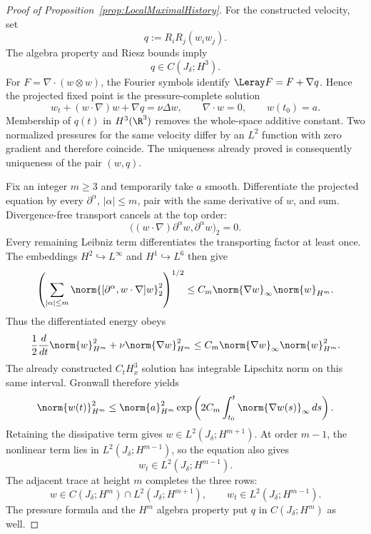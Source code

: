 \begin{proof}[Proof of Proposition~\ref{prop:LocalMaximalHistory}]

For the constructed velocity, set
\begin{equation}
  q:=R_iR_j(w_iw_j).
  \label{eq:LocalPressureFormula}
\end{equation}
The algebra property and Riesz bounds imply
\[
  q\in C(J_\delta;H^3).
\]
For \(F=\nabla\!\cdot(w\otimes w)\), the Fourier symbols identify
\(\Leray F=F+\nabla q\).  Hence the projected fixed point is the
pressure-complete solution
\[
  w_t+(w\cdot\nabla)w+\nabla q=\nu\Delta w,
  \qquad
  \nabla\cdot w=0,
  \qquad
  w(t_0)=a.
\]
Membership of \(q(t)\) in \(H^3(\R^3)\) removes the whole-space additive
constant.  Two normalized pressures for the same velocity differ by an
\(L^2\) function with zero gradient and therefore coincide.  The uniqueness
already proved is consequently uniqueness of the pair \((w,q)\).


Fix an integer \(m\geq3\) and temporarily take \(a\) smooth.  Differentiate the
projected equation by every \(\partial^\alpha\), \(|\alpha|\leq m\), pair with
the same derivative of \(w\), and sum.  Divergence-free transport cancels at the
top order:
\[
  \bigl((w\cdot\nabla)\partial^\alpha w,\partial^\alpha w\bigr)_2=0.
\]
Every remaining Leibniz term differentiates the transporting factor at least
once.  The embeddings \(H^2\hookrightarrow L^\infty\) and
\(H^1\hookrightarrow L^6\) then give
\[
  \left(
  \sum_{|\alpha|\leq m}
  \norm{[\partial^\alpha,w\cdot\nabla]w}_2^2
  \right)^{1/2}
  \leq C_m\norm{\nabla w}_\infty\norm{w}_{H^m}.
\]
Thus the differentiated energy obeys
\begin{equation}
  \frac12\frac d{dt}\norm{w}_{H^m}^2
  +\nu\norm{\nabla w}_{H^m}^2
  \leq C_m\norm{\nabla w}_\infty\norm{w}_{H^m}^2.
  \label{eq:LocalPersistenceEnergy}
\end{equation}
The already constructed \(C_tH^3_x\) solution has integrable Lipschitz norm on
this same interval.  Gronwall therefore yields
\begin{equation}
  \norm{w(t)}_{H^m}^2
  \leq
  \norm{a}_{H^m}^2
  \exp\left(
    2C_m\int_{t_0}^{t}\norm{\nabla w(s)}_\infty\,ds
  \right).
  \label{eq:LocalPersistenceBound}
\end{equation}
Retaining the dissipative term gives \(w\in L^2(J_\delta;H^{m+1})\).  At order
\(m-1\), the nonlinear term lies in \(L^2(J_\delta;H^{m-1})\), so the equation
also gives
\[
  w_t\in L^2(J_\delta;H^{m-1}).
\]
The adjacent trace at height \(m\) completes the three rows:
\begin{equation}
  w\in C(J_\delta;H^m)
  \cap L^2(J_\delta;H^{m+1}),
  \qquad
  w_t\in L^2(J_\delta;H^{m-1}).
  \label{eq:LocalHigherPersistence}
\end{equation}
The pressure formula and the \(H^m\) algebra property put
\(q\) in \(C(J_\delta;H^m)\) as well.


\end{proof}
